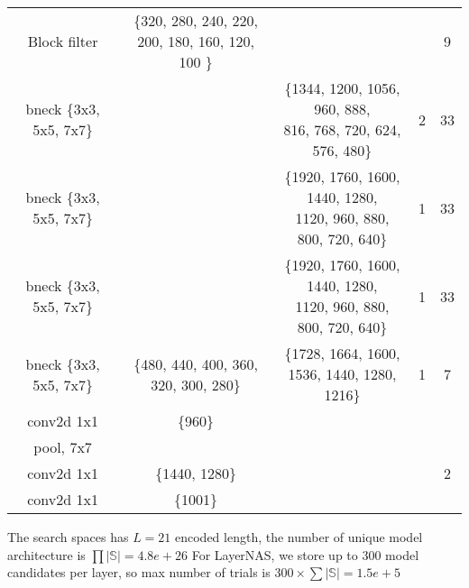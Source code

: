 \begin{table}
\begin{center}
\begin{tabular}[hp]{c|c|c|c|c}
Block filter &\shortstack{\{320, 280, 240, 220, \\ 200, 180, 160, 120, 100 \}} & & &9 \\
  bneck \{3x3, 5x5, 7x7\} & &\shortstack{\{1344, 1200, 1056, 960, 888, \\ 816, 768, 720, 624, 576, 480\}} &2 &33 \\
  bneck \{3x3, 5x5, 7x7\} & &\shortstack{\{1920, 1760, 1600, 1440, 1280, \\ 1120, 960, 880, 800, 720, 640\}} &1  &33\\
  bneck \{3x3, 5x5, 7x7\} & &\shortstack{\{1920, 1760, 1600, 1440, 1280, \\ 1120, 960, 880, 800, 720, 640\}} &1 &33 \\
\hline
  bneck \{3x3, 5x5, 7x7\} &\{480, 440, 400, 360, 320, 300, 280\} &\shortstack{\{1728, 1664, 1600, \\ 1536, 1440, 1280, 1216\}} &1 &7\\
\hline
  conv2d 1x1 &\{960\} & & \\
  pool, 7x7  & & &\\
  conv2d 1x1  &\{1440, 1280\} & &  &2\\
  conv2d 1x1 &\{1001\} & & \\
\hline
\hline

\end{tabular}
\end{center}
\end{table}

The search spaces has $L=21$ encoded length, the number of unique model architecture is $\prod |\mathbb{S}| = 4.8e+26$
For LayerNAS, we store up to 300 model candidates per layer, so max number of trials is $300 \times {\sum{|\mathbb{S}|}} = 1.5e+5$



